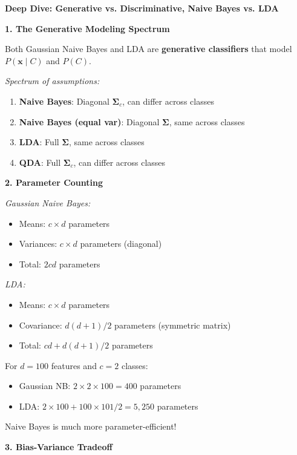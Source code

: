 \documentclass[12pt]{article}
\begin{document}
\begin{explanation}
\textbf{Deep Dive: Generative vs. Discriminative, Naive Bayes vs. LDA}

\textbf{1. The Generative Modeling Spectrum}

Both Gaussian Naive Bayes and LDA are \textbf{generative classifiers} that model $P(\mathbf{x} \mid C)$ and $P(C)$.

\textit{Spectrum of assumptions:}
\begin{enumerate}
    \item \textbf{Naive Bayes}: Diagonal $\boldsymbol{\Sigma}_c$, can differ across classes
    \item \textbf{Naive Bayes (equal var)}: Diagonal $\boldsymbol{\Sigma}$, same across classes
    \item \textbf{LDA}: Full $\boldsymbol{\Sigma}$, same across classes
    \item \textbf{QDA}: Full $\boldsymbol{\Sigma}_c$, can differ across classes
\end{enumerate}

\textbf{2. Parameter Counting}

\textit{Gaussian Naive Bayes:}
\begin{itemize}
    \item Means: $c \times d$ parameters
    \item Variances: $c \times d$ parameters (diagonal)
    \item Total: $2cd$ parameters
\end{itemize}

\textit{LDA:}
\begin{itemize}
    \item Means: $c \times d$ parameters
    \item Covariance: $d(d+1)/2$ parameters (symmetric matrix)
    \item Total: $cd + d(d+1)/2$ parameters
\end{itemize}

For $d = 100$ features and $c = 2$ classes:
\begin{itemize}
    \item Gaussian NB: $2 \times 2 \times 100 = 400$ parameters
    \item LDA: $2 \times 100 + 100 \times 101 / 2 = 5,250$ parameters
\end{itemize}

Naive Bayes is much more parameter-efficient!

\textbf{3. Bias-Variance Tradeoff}


\end{explanation}
\end{document}
